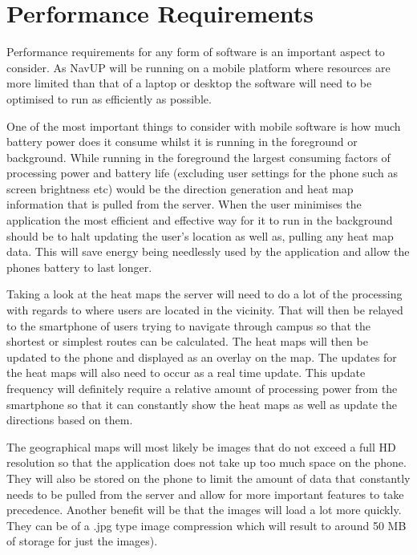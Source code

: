 \documentclass[11pt]{article}
\begin{document}
\section{Performance Requirements}

Performance requirements for any form of software is an important aspect to consider. As NavUP will be running on a mobile platform where resources are more limited than that of a laptop or desktop the software will need to be optimised to run as efficiently as possible.

One of the most important things to consider with mobile software is how much battery power does it consume whilst it is running in the foreground or background. While running in the foreground the largest consuming factors of processing power and battery life (excluding user settings for the phone such as screen brightness etc) would be the direction generation and heat map information that is pulled from the server. When the user minimises the application the most efficient and effective way for it to run in the background should be to halt updating the user’s location as well as, pulling any heat map data. This will save energy being needlessly used by the application and allow the phones battery to last longer. 

Taking a look at the heat maps the server will need to do a lot of the processing with regards to where users are located in the vicinity. That will then be relayed to the smartphone of users trying to navigate through campus so that the shortest or simplest routes can be calculated. The heat maps will then be updated to the phone and displayed as an overlay on the map. The updates for the heat maps will also need to occur as a real time update. This update frequency will definitely require a relative amount of processing power from the smartphone so that it can constantly show the heat maps as well as update the directions based on them.

The geographical maps will most likely be images that do not exceed a full HD resolution so that the application does not take up too much space on the phone. They will also be stored on the phone to limit the amount of data that constantly needs to be pulled from the server and allow for more important features to take precedence. Another benefit will be that the images will load a lot more quickly. They can be of a .jpg type image compression which will result to around 50 MB of storage for just the images). 
\end{document}
